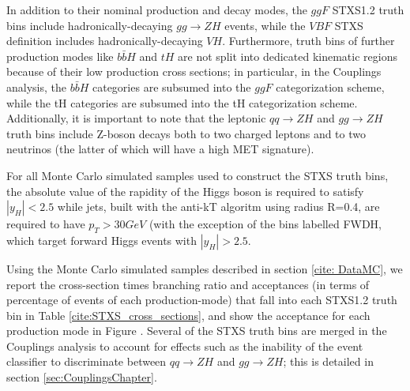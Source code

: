 In addition to their nominal production and decay modes, the $ggF$ STXS1.2 truth bins include hadronically-decaying $gg \rightarrow ZH$ events, while the $VBF$ STXS definition includes hadronically-decaying $VH$. Furthermore, truth bins of further production modes like $b\bar{b}H$ and $tH$ are not split into dedicated kinematic regions because of their low production cross sections; in particular, in the Couplings analysis, the $b\bar{b}H$ categories are subsumed into the $ggF$ categorization scheme, while the tH categories are subsumed into the tH categorization scheme. Additionally, it is important to note that the leptonic $qq \rightarrow ZH$ and $gg \rightarrow ZH$ truth bins include Z-boson decays both to two charged leptons and to two neutrinos (the latter of which will have a high MET signature). 

For all Monte Carlo simulated samples used to construct the STXS truth bins, the absolute value of the rapidity of the Higgs boson is required to satisfy $|y_{H}| < 2.5$ while jets, built with the anti-kT algoritm using radius R=0.4, are required to have $p_{T} > 30 GeV$ (with the exception of the bins labelled FWDH, which target forward Higgs events with $|y_{H}| > 2.5$.

Using the Monte Carlo simulated samples described in section \ref{cite: DataMC}, we report the cross-section times branching ratio and acceptances (in terms of percentage of events of each production-mode) that fall into each STXS1.2 truth bin in Table \ref{cite:STXS_cross_sections}, and show the acceptance for each production mode in Figure . Several of the STXS truth bins are merged in the Couplings analysis to account for effects such as the inability of the event classifier to discriminate between $qq \rightarrow ZH$ and $gg \rightarrow ZH$; this is detailed in section \ref{sec:CouplingsChapter}.

